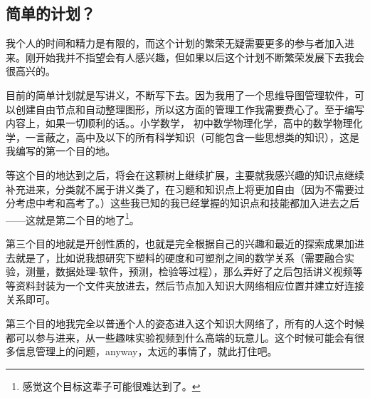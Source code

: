 \documentclass[12pt]{exam}%
\begin{document}
\subsection{简单的计划？}
我个人的时间和精力是有限的，而这个计划的繁荣无疑需要更多的参与者加入进来。刚开始我并不指望会有人感兴趣，但如果以后这个计划不断繁荣发展下去我会很高兴的。

目前的简单计划就是写讲义，不断写下去。因为我用了一个思维导图管理软件，可以创建自由节点和自动整理图形，所以这方面的管理工作我需要费心了。至于编写内容上，如果一切顺利的话。。小学数学， 初中数学物理化学，高中的数学物理化学，一言蔽之，高中及以下的所有科学知识（可能包含一些思想类的知识），这是我编写的第一个目的地。

等这个目的地达到之后，将会在这颗树上继续扩展，主要就我感兴趣的知识点继续补充进来，分类就不属于讲义类了，在习题和知识点上将更加自由（因为不需要过分考虑中考和高考了。）这些我已知的我已经掌握的知识点和技能都加入进去之后——这就是第二个目的地了\footnote{感觉这个目标这辈子可能很难达到了。}。

第三个目的地就是开创性质的，也就是完全根据自己的兴趣和最近的探索成果加进去就是了，比如说我想研究下塑料的硬度和可塑剂之间的数学关系（需要融合实验，测量，数据处理-软件，预测，检验等过程），那么弄好了之后包括讲义视频等等资料封装为一个文件夹放进去，然后节点加入知识大网络相应位置并建立好连接关系即可。

第三个目的地我完全以普通个人的姿态进入这个知识大网络了，所有的人这个时候都可以参与进来，从一些趣味实验视频到什么高端的玩意儿。这个时候可能会有很多信息管理上的问题，anyway，太远的事情了，就此打住吧。
\end{document}

